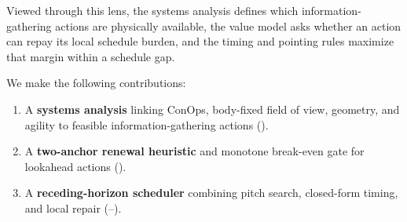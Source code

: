 Viewed through this lens, the systems analysis defines which information-gathering actions are physically available, the value model asks whether an action can repay its local schedule burden, and the timing and pointing rules maximize that margin within a schedule gap.

We make the following contributions:
\begin{enumerate}
    \item A \textbf{systems analysis} linking ConOps, body-fixed field of view, geometry, and agility to feasible information-gathering actions ().
    \item A \textbf{two-anchor renewal heuristic} and monotone break-even gate for lookahead actions ().
    \item A \textbf{receding-horizon scheduler} combining pitch search, closed-form timing, and local repair (--).
\end{enumerate}

